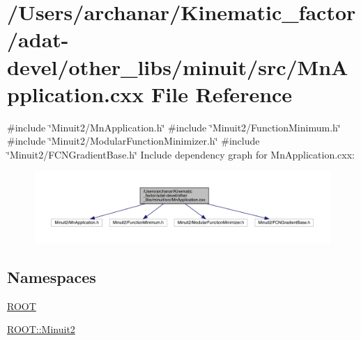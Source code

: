 \hypertarget{adat-devel_2other__libs_2minuit_2src_2MnApplication_8cxx}{}\section{/\+Users/archanar/\+Kinematic\+\_\+factor/adat-\/devel/other\+\_\+libs/minuit/src/\+Mn\+Application.cxx File Reference}
\label{adat-devel_2other__libs_2minuit_2src_2MnApplication_8cxx}
{\ttfamily \#include \char`\"{}Minuit2/\+Mn\+Application.\+h\char`\"{}}\newline
{\ttfamily \#include \char`\"{}Minuit2/\+Function\+Minimum.\+h\char`\"{}}\newline
{\ttfamily \#include \char`\"{}Minuit2/\+Modular\+Function\+Minimizer.\+h\char`\"{}}\newline
{\ttfamily \#include \char`\"{}Minuit2/\+F\+C\+N\+Gradient\+Base.\+h\char`\"{}}\newline
Include dependency graph for Mn\+Application.\+cxx\+:
\nopagebreak
\begin{figure}[H]
\begin{center}
\leavevmode
\includegraphics[width=350pt]{df/dff/adat-devel_2other__libs_2minuit_2src_2MnApplication_8cxx__incl}
\end{center}
\end{figure}
\subsection*{Namespaces}
\begin{DoxyCompactItemize}
\item 
 \mbox{\hyperlink{namespaceROOT}{R\+O\+OT}}
\item 
 \mbox{\hyperlink{namespaceROOT_1_1Minuit2}{R\+O\+O\+T\+::\+Minuit2}}
\end{DoxyCompactItemize}
